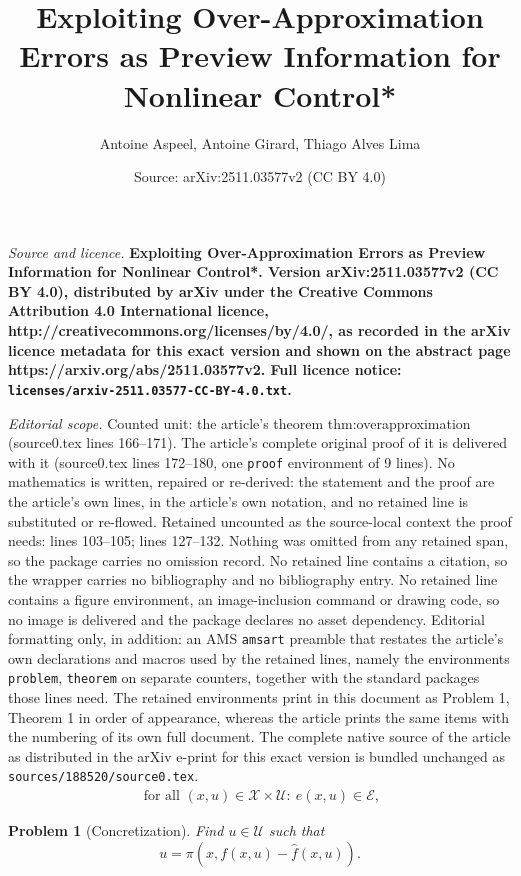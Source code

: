 \documentclass[10pt,a4paper]{amsart}
\title{\LARGE \bf Exploiting Over-Approximation Errors as Preview Information for Nonlinear Control*}
\author{Antoine Aspeel, Antoine Girard, Thiago Alves Lima}
\date{Source: arXiv:2511.03577v2 (CC BY 4.0)}
\newtheorem{problem}{Problem}
\newcommand{\E}{\mathcal{E}}
\newcommand{\U}{\mathcal{U}}
\newcommand{\X}{\mathcal{X}}
\begin{document}
\maketitle

\noindent\emph{Source and licence.} \LARGE \bf Exploiting Over-Approximation Errors as Preview Information for Nonlinear Control*. Version arXiv:2511.03577v2 (CC BY 4.0), distributed by arXiv under the Creative Commons Attribution 4.0 International licence, http://creativecommons.org/licenses/by/4.0/, as recorded in the arXiv licence metadata for this exact version and shown on the abstract page https://arxiv.org/abs/2511.03577v2. Full licence notice: \texttt{licenses/arxiv-2511.03577-CC-BY-4.0.txt}.\par\smallskip

\noindent\textit{Editorial scope.} Counted unit: the article's theorem thm:overapproximation (source0.tex lines 166--171). The article's complete original proof of it is delivered with it (source0.tex lines 172--180, one \texttt{proof} environment of 9 lines). No mathematics is written, repaired or re-derived: the statement and the proof are the article's own lines, in the article's own notation, and no retained line is substituted or re-flowed.  Retained uncounted as the source-local context the proof needs: lines 103--105; lines 127--132.  Nothing was omitted from any retained span, so the package carries no omission record.  No retained line contains a citation, so the wrapper carries no bibliography and no bibliography entry.  No retained line contains a figure environment, an image-inclusion command or drawing code, so no image is delivered and the package declares no asset dependency.  Editorial formatting only, in addition: an AMS \texttt{amsart} preamble that restates the article's own declarations and macros used by the retained lines, namely the environments \texttt{problem}, \texttt{theorem} on separate counters, together with the standard packages those lines need.  The retained environments print in this document as Problem 1, Theorem 1 in order of appearance, whereas the article prints the same items with the numbering of its own full document.  The complete native source of the article as distributed in the arXiv e-print for this exact version is bundled unchanged as \texttt{sources/188520/source0.tex}.
\begin{align}\label{eq:errorInclusion}
\text{ for all } (x,u)\in\X\times\U:\ e(x,u)\in\E,
\end{align}

\begin{problem}[Concretization]\label{prob:concretization}
Find $u\in\U$ such that
$$
u=\pi(x,f(x,u)-\hat{f}(x,u)).
$$
\end{problem}
\end{document}
